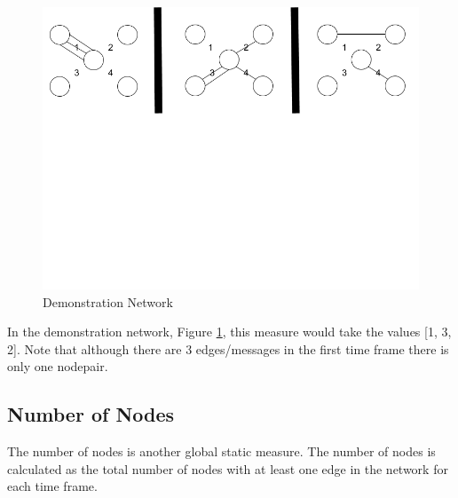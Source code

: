 \begin{figure}[H]
  \begin{center}
  \includegraphics[trim={0 11cm 0 0}, clip, width=140mm]{./Figures/globalMeasuresReferenceNetwork.png}
  \end{center}
  \caption{Demonstration Network}
  \label{fig:demonstrationNetwork}
\end{figure}


In the demonstration network, Figure \ref{fig:demonstrationNetwork}, this measure would take the values [1, 3, 2]. Note that although there are 3 edges/messages in the first time frame there is only one nodepair.



\subsection{Number of Nodes}
The number of nodes is another global static measure. The number of nodes is calculated as the total number of nodes with at least one edge in the network for each time frame.

